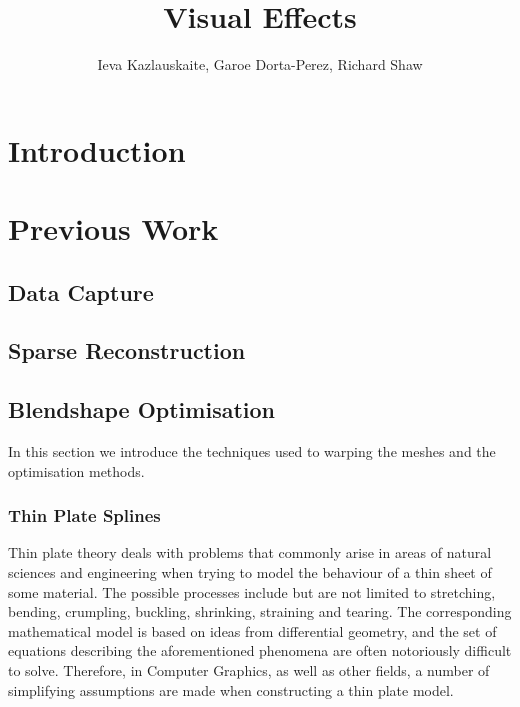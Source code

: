 \documentclass[11pt]{article}
\title{Visual Effects} \author{Ieva Kazlauskaite, Garoe Dorta-Perez, Richard Shaw}
\begin{document}
\maketitle

\section{Introduction}
\label{ch:intro}
\begin{center}
\end{center}


\section{Previous Work}
\label{sec:previous}

\subsection{Data Capture}

\subsection{Sparse Reconstruction}


\subsection{Blendshape Optimisation}
In this section we introduce the techniques used to warping the meshes and the optimisation methods.

\subsubsection{Thin Plate Splines}
Thin plate theory deals with problems that commonly arise in areas of natural sciences and engineering when trying to model the behaviour of a thin sheet of some material. The possible processes include but are not limited to stretching, bending, crumpling, buckling, shrinking, straining and tearing. The corresponding mathematical model is based on ideas from differential geometry, and the set of equations describing the aforementioned phenomena are often notoriously difficult to solve. Therefore, in Computer Graphics, as well as other fields, a number of simplifying assumptions are made when constructing a thin plate model. 
\end{document}
